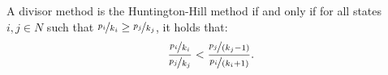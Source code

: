 \documentclass[preview, border={0pt 2pt 1pt 1pt}, varwidth=10cm]{standalone} %
\begin{document}




    A divisor method is the Huntington-Hill method if and only if
    for all states \(i, j \in N\) such that \(\nicefrac{p_i}{k_i} \geq \nicefrac{p_j}{k_j}\),
    it holds that:
    \[
        \frac{\nicefrac{p_i}{k_i}}{\nicefrac{p_j}{k_j}} < \frac{\nicefrac{p_j}{(k_j-1)}}{\nicefrac{p_i}{(k_i+1)}}.
    \]






\end{document}
